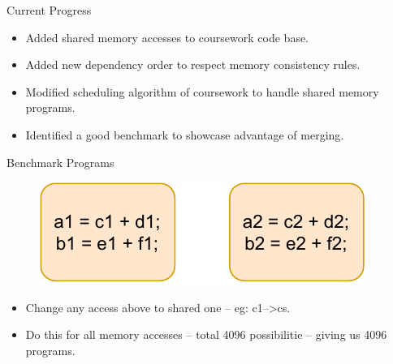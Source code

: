 \documentclass[notes, xcolor=dvipsnames]{beamer}
\begin{document}
    \begin{frame}{Current Progress}
        \begin{itemize}
            \item Added shared memory accesses to coursework code base. 
            \item Added new dependency order to respect memory consistency rules.
            \item Modified scheduling algorithm of coursework to handle shared memory programs.
            \item Identified a good benchmark to showcase advantage of merging. 
        \end{itemize}
    \end{frame}

    \begin{frame}{Benchmark Programs}

        \begin{figure}
            \includegraphics[scale=0.6]{Benchmark.pdf}
        \end{figure}

        \begin{itemize}
            \item Change any access above to shared one -- eg: c1-->cs.  
            \item Do this for all memory accesses -- total 4096 possibilitie -- giving us 4096 programs.
        \end{itemize}
        
    \end{frame}
\end{document}
